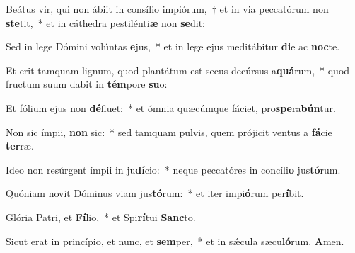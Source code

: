 \item Beátus vir, qui non ábiit in consílio impiórum,~† et in via peccatórum non \textbf{ste}tit,~* et in cáthedra pestilénti\textbf{æ} non \textbf{se}dit:
\item Sed in lege Dómini volúntas \textbf{e}jus,~* et in lege ejus meditábitur \textbf{di}e ac \textbf{noc}te.
\item Et erit tamquam lignum, quod plantátum est secus decúrsus a\textbf{quá}rum,~* quod fructum suum dabit in \textbf{tém}pore \textbf{su}o:
\item Et fólium ejus non \textbf{dé}fluet:~* et ómnia quæcúmque fáciet, pro\textbf{spe}ra\textbf{bún}tur.
\item Non sic ímpii, \textbf{non} sic:~* sed tamquam pulvis, quem prójicit ventus a \textbf{fá}cie \textbf{ter}ræ.
\item Ideo non resúrgent ímpii in ju\textbf{dí}cio:~* neque peccatóres in concíli\textbf{o} jus\textbf{tó}rum.
\item Quóniam novit Dóminus viam jus\textbf{tó}rum:~* et iter impi\textbf{ó}rum per\textbf{í}bit.
\item Glória Patri, et \textbf{Fí}lio,~* et Spi\textbf{rí}tui \textbf{Sanc}to.
\item Sicut erat in princípio, et nunc, et \textbf{sem}per,~* et in sǽcula sæcu\textbf{ló}rum. \textbf{A}men.
